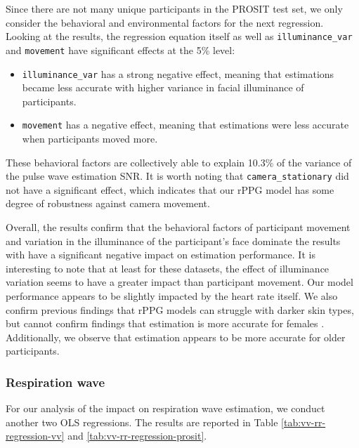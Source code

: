 \documentclass{article}
\begin{document}
Since there are not many unique participants in the PROSIT test set, we only consider the behavioral and environmental factors for the next regression.
Looking at the results, the regression equation itself as well as \texttt{illuminance\_var} and \texttt{movement} have significant effects at the 5\% level: 

\begin{itemize}
	\item \texttt{illuminance\_var} has a strong negative effect, meaning that estimations became less accurate with higher variance in facial illuminance of participants.
	\item \texttt{movement} has a negative effect, meaning that estimations were less accurate when participants moved more.
\end{itemize}

These behavioral factors are collectively able to explain 10.3\% of the variance of the pulse wave estimation SNR.
It is worth noting that \texttt{camera\_stationary} did not have a significant effect, which indicates that our rPPG model has some degree of robustness against camera movement.

Overall, the results confirm that the behavioral factors of participant movement and variation in the illuminance of the participant's face dominate the results with have a significant negative impact on estimation performance.
It is interesting to note that at least for these datasets, the effect of illuminance variation seems to have a greater impact than participant movement.
Our model performance appears to be slightly impacted by the heart rate itself.
We also confirm previous findings that rPPG models can struggle with darker skin types, but cannot confirm findings that estimation is more accurate for females \cite{nowara2020meta}.
Additionally, we observe that estimation appears to be more accurate for older participants.

\subsubsection{Respiration wave}

For our analysis of the impact on respiration wave estimation, we conduct another two OLS regressions.
The results are reported in Table \ref{tab:vv-rr-regression-vv} and \ref{tab:vv-rr-regression-prosit}.
\end{document}

